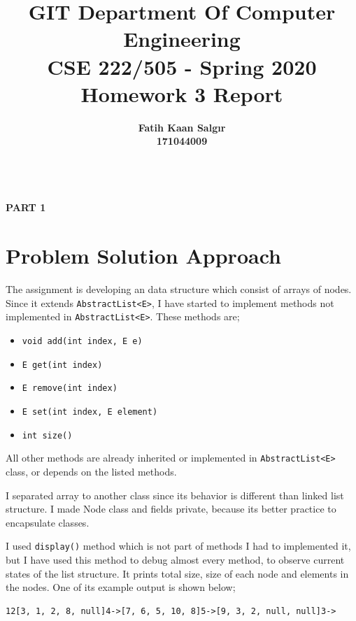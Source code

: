 \documentclass[a4paper]{article}
\title{\textbf{GIT Department Of Computer Engineering\\ 
CSE 222/505 - Spring 2020\\
Homework 3 Report \vspace{1in}}}
\author{\textbf{Fatih Kaan Salgır} \\ 
\textbf{171044009}}
\date{}
\begin{document}
\begin{large}

  \maketitle

\newpage


\begin{center}
  \textbf{ \\
  \vspace{3cm}
  \Huge{PART 1}
  }
\end{center}

\newpage


\section{Problem Solution Approach}

The assignment is developing an data structure which consist of arrays of nodes. Since it extends \texttt{AbstractList<E>}, I have started to implement methods not implemented in \texttt{AbstractList<E>}. These methods are;

\begin{itemize}
  \item \texttt{void add(int index, E e)}
  \item \texttt{E get(int index)}
  \item \texttt{E remove(int index)}
  \item \texttt{E set(int index, E element)}
  \item \texttt{int size()}
\end{itemize}

All other methods are already inherited or implemented in \texttt{AbstractList<E>} class, or depends on the listed methods.
\vspace{1em}

I separated array to another class since its behavior is different than linked list structure. I made Node class and fields private, because its better practice to encapsulate classes.
\vspace{1em}

I used \texttt{display()} method which is not part of methods I had to implemented it, but I have used this method to debug almost every method, to observe current states of the list structure. It prints total size, size of each node and elements in the nodes. One of its example output is shown below;

\begin{verbatim}
12[3, 1, 2, 8, null]4->[7, 6, 5, 10, 8]5->[9, 3, 2, null, null]3->
\end{verbatim}


\end{large}
\end{document}

